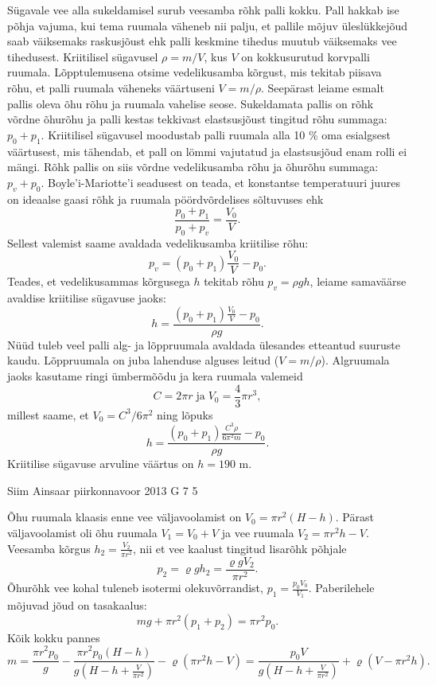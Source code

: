\documentclass[11pt, twoside]{article}
\begin{document}
{{\ifSolution
Sügavale vee alla sukeldamisel surub veesamba rõhk palli kokku. Pall hakkab ise põhja vajuma, kui tema ruumala väheneb nii palju, et pallile mõjuv üleslükkejõud saab väiksemaks raskusjõust ehk palli keskmine tihedus muutub väiksemaks vee tihedusest. Kriitilisel sügavusel $\rho=m/V$, kus $V$ on kokkusurutud korvpalli ruumala. Lõpptulemusena otsime vedelikusamba kõrgust, mis tekitab piisava rõhu, et palli ruumala väheneks väärtuseni $V=m/\rho$. Seepärast leiame esmalt pallis oleva õhu rõhu ja ruumala vahelise seose. Sukeldamata pallis on rõhk võrdne õhurõhu ja palli kestas tekkivast elastsusjõust tingitud rõhu summaga: $p_0+p_1$. Kriitilisel sügavusel moodustab palli ruumala alla 10 \% oma esialgsest väärtusest, mis tähendab, et pall on lömmi vajutatud ja elastsusjõud enam rolli ei mängi. Rõhk pallis on siis võrdne vedelikusamba rõhu ja õhurõhu summaga: $p_v+p_0$. Boyle'i-Mariotte'i seadusest on teada, et konstantse temperatuuri juures on ideaalse gaasi rõhk ja ruumala pöördvõrdelises sõltuvuses ehk
\[
\frac{p_0+p_1}{p_0+p_v}=\frac{V_0}{V}.
\]
Sellest valemist saame avaldada vedelikusamba kriitilise rõhu:
\[
p_v = (p_0+p_1) \frac{V_0}{V} - p_0.
\]
Teades, et vedelikusammas kõrgusega $h$ tekitab rõhu $p_v=\rho g h$, leiame samaväärse avaldise kriitilise sügavuse jaoks:
\[
h = \frac{(p_0+p_1) \frac{V_0}{V} - p_0}{\rho g}.
\]
Nüüd tuleb veel palli alg- ja lõppruumala avaldada ülesandes etteantud suuruste kaudu. Lõppruumala on juba lahenduse alguses leitud ($V=m/\rho$). Algruumala jaoks kasutame ringi ümbermõõdu ja kera ruumala valemeid
\[
C = 2\pi r \; \text{ja} \; V_0 = \frac{4}{3}\pi r^3,
\]
millest saame, et $V_0=C^3/6\pi^2$ ning lõpuks
\[
h = \frac{(p_0+p_1) \frac{C^3 \rho}{6\pi^2 m} - p_0}{\rho g}.
\]
Kriitilise sügavuse arvuline väärtus on $h=190$ m.
\fi
}

{Siim Ainsaar} %
{piirkonnavoor} %
{2013} %
{G 7} %
{5} %
{

\ifSolution
Õhu ruumala klaasis enne vee väljavoolamist on 
$V_0 = \pi r^2 (H-h)$.
Pärast väljavoolamist oli õhu ruumala
$V_1 = V_0 + V$
ja vee ruumala
$V_2 = \pi r^2 h - V$.
Veesamba kõrgus
$h_2 = \frac{ V_2 }{ \pi r^2 }$,
nii et vee kaalust tingitud lisarõhk põhjale
\[
p_2 = \varrho g h_2 = \frac{ \varrho g V_2 }{ \pi r^2 }.
\]
Õhurõhk vee kohal tuleneb isotermi olekuvõrrandist,
$p_1 = \frac{p_0 V_0}{V_1}$.
Paberilehele mõjuvad jõud on tasakaalus:
\[
mg + \pi r^2 (p_1 + p_2) = \pi r^2 p_0.
\]
Kõik kokku pannes
\[ m =
\frac{ \pi r^2 p_0 }{ g } -
\frac{ \pi r^2 p_0 (H-h) }{ g \left( H - h + \frac{V}{\pi r^2} \right) } -
\varrho \left( \pi r^2 h - V \right)
=
\frac{ p_0 V }{ g \left( H - h + \frac{V}{ \pi r^2 } \right) } + \varrho \left( V - \pi r^2 h \right).
\]
\fi
}

}
\end{document}
